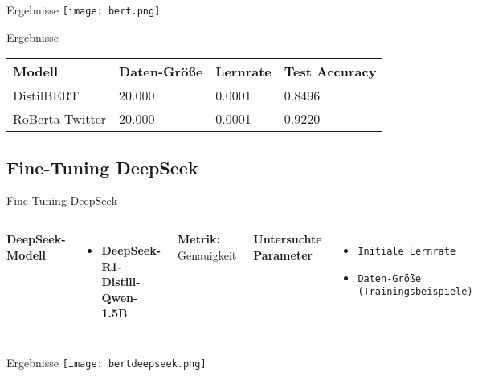 \documentclass[aspectratio=169]{beamer} %
\begin{document}
\begin{frame}{Ergebnisse}
    \centering
     \texttt{[image: bert.png]}
\end{frame}

\begin{frame}{Ergebnisse}
    \centering
    \scriptsize
    \begin{tabular}{|l|l|l|l|}
        \hline
        \textbf{Modell} & \textbf{Daten-Größe} & \textbf{Lernrate} & \textbf{Test Accuracy} \\
        \hline
        DistilBERT & 20.000 & 0.0001 & 0.8496 \\
        RoBerta-Twitter & 20.000 & 0.0001 & 0.9220 \\
        \hline
    \end{tabular}
\end{frame}

\subsection{Fine-Tuning DeepSeek}
\begin{frame}{Fine-Tuning DeepSeek}
  \fontsize{10pt}{12pt}\selectfont
  \vspace{0.3cm}

  \begin{columns}
      \textbf{DeepSeek-Modell}
      \vspace{0.3cm}
      \begin{itemize}
          \item \textbf{DeepSeek-R1-Distill-Qwen-1.5B}
      \end{itemize}
      \vspace{0.5cm}
      \textbf{Metrik:} Genauigkeit
      \vspace{-0.6cm}

      \textbf{Untersuchte Parameter}
      \vspace{0.3cm}
      \begin{itemize}
          \item \texttt{Initiale Lernrate}
          \item \texttt{Daten-Größe (Trainingsbeispiele)}
      \end{itemize}
  \end{columns}
\end{frame}

\begin{frame}{Ergebnisse}
    \centering
    \texttt{[image: bertdeepseek.png]}
\end{frame}
\end{document}
